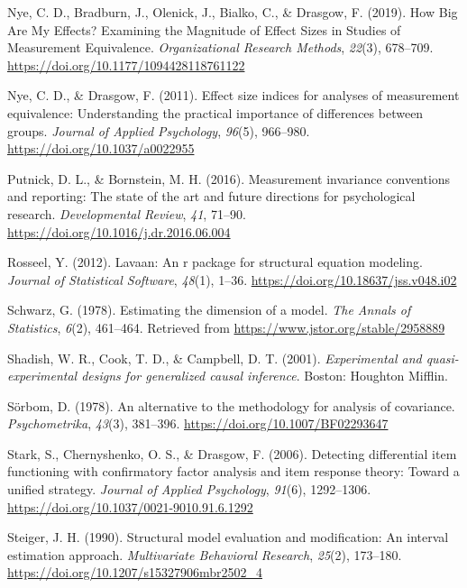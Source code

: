 \documentclass[
  man]{apa6}
\newlength{\cslhangindent}
\newlength{\cslentryspacingunit} %
\newenvironment{CSLReferences}[2] %
 {%
  \setlength{\parindent}{0pt}
  \ifodd #1
  \let\oldpar\par
  \def\par{\hangindent=\cslhangindent\oldpar}
  \fi
  \setlength{\parskip}{#2\cslentryspacingunit}
 }%
 {}
\begin{document}
\begin{CSLReferences}{1}{0}
\leavevmode{}%
Nye, C. D., Bradburn, J., Olenick, J., Bialko, C., \& Drasgow, F. (2019). How Big Are My Effects? Examining the Magnitude of Effect Sizes in Studies of Measurement Equivalence. \emph{Organizational Research Methods}, \emph{22}(3), 678--709. \url{https://doi.org/10.1177/1094428118761122}

\leavevmode{}%
Nye, C. D., \& Drasgow, F. (2011). Effect size indices for analyses of measurement equivalence: Understanding the practical importance of differences between groups. \emph{Journal of Applied Psychology}, \emph{96}(5), 966--980. \url{https://doi.org/10.1037/a0022955}

\leavevmode{}%
Putnick, D. L., \& Bornstein, M. H. (2016). Measurement invariance conventions and reporting: The state of the art and future directions for psychological research. \emph{Developmental Review}, \emph{41}, 71--90. \url{https://doi.org/10.1016/j.dr.2016.06.004}

\leavevmode{}%
Rosseel, Y. (2012). Lavaan: An r package for structural equation modeling. \emph{Journal of Statistical Software}, \emph{48}(1), 1--36. \url{https://doi.org/10.18637/jss.v048.i02}

\leavevmode{}%
Schwarz, G. (1978). Estimating the dimension of a model. \emph{The Annals of Statistics}, \emph{6}(2), 461--464. Retrieved from \url{https://www.jstor.org/stable/2958889}

\leavevmode{}%
Shadish, W. R., Cook, T. D., \& Campbell, D. T. (2001). \emph{Experimental and quasi-experimental designs for generalized causal inference}. Boston: Houghton Mifflin.

\leavevmode{}%
Sörbom, D. (1978). An alternative to the methodology for analysis of covariance. \emph{Psychometrika}, \emph{43}(3), 381--396. \url{https://doi.org/10.1007/BF02293647}

\leavevmode{}%
Stark, S., Chernyshenko, O. S., \& Drasgow, F. (2006). Detecting differential item functioning with confirmatory factor analysis and item response theory: Toward a unified strategy. \emph{Journal of Applied Psychology}, \emph{91}(6), 1292--1306. \url{https://doi.org/10.1037/0021-9010.91.6.1292}

\leavevmode{}%
Steiger, J. H. (1990). Structural model evaluation and modification: An interval estimation approach. \emph{Multivariate Behavioral Research}, \emph{25}(2), 173--180. \url{https://doi.org/10.1207/s15327906mbr2502_4}


\end{CSLReferences}
\end{document}
